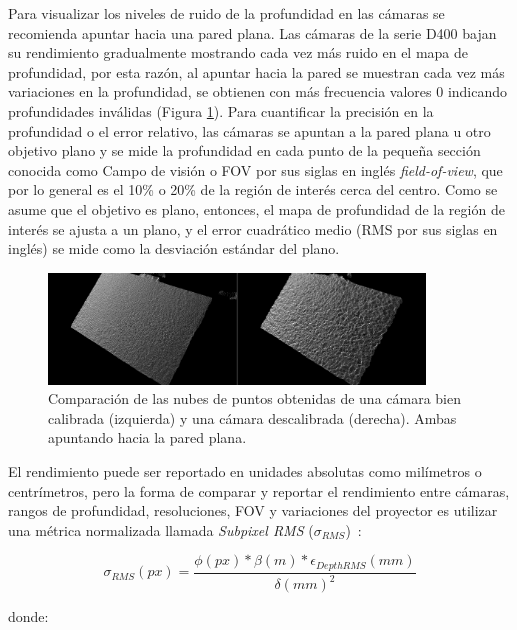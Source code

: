 Para visualizar los niveles de ruido de la profundidad en las cámaras se recomienda apuntar hacia una pared plana. Las cámaras de la serie D400 bajan su rendimiento gradualmente mostrando cada vez más ruido en el mapa de profundidad, por esta razón, al apuntar hacia la pared se muestran cada vez más variaciones en la profundidad, se obtienen con más frecuencia valores 0 indicando profundidades inválidas (Figura \ref{fig:calibration}). Para cuantificar la precisión en la profundidad o el error relativo, las cámaras se apuntan a la pared plana u otro objetivo plano y se mide la profundidad en cada punto de la pequeña sección conocida como Campo de visión o FOV por sus siglas en inglés \textit{field-of-view}, que por lo general es el 10\% o 20\% de la región de interés cerca del centro. Como se asume que el objetivo es plano, entonces, el mapa de profundidad de la región de interés se ajusta a un plano, y el error cuadrático medio (RMS por sus siglas en inglés) se mide como la desviación estándar del plano.

\begin{figure}[ht]
	\centering
	\includegraphics[width=10cm]{./Graphics/calibration.png}
	\caption{Comparación de las nubes de puntos obtenidas de una cámara bien calibrada (izquierda) y una cámara descalibrada (derecha). Ambas apuntando hacia la pared plana.}
	\label{fig:calibration}
\end{figure}

El rendimiento puede ser reportado en unidades absolutas como milímetros o centrímetros, pero la forma de comparar y reportar el rendimiento entre cámaras, rangos de profundidad, resoluciones, FOV y variaciones del proyector es utilizar una métrica normalizada llamada \textit{Subpixel RMS} ($\sigma_{RMS}$)~\cite{grunnet2021intel}:

\begin{equation}
	\sigma_{RMS}(px) = \frac{\phi(px) * \beta(m) * \epsilon_{DepthRMS}(mm)}{\delta(mm)^2}
\end{equation}

donde:

